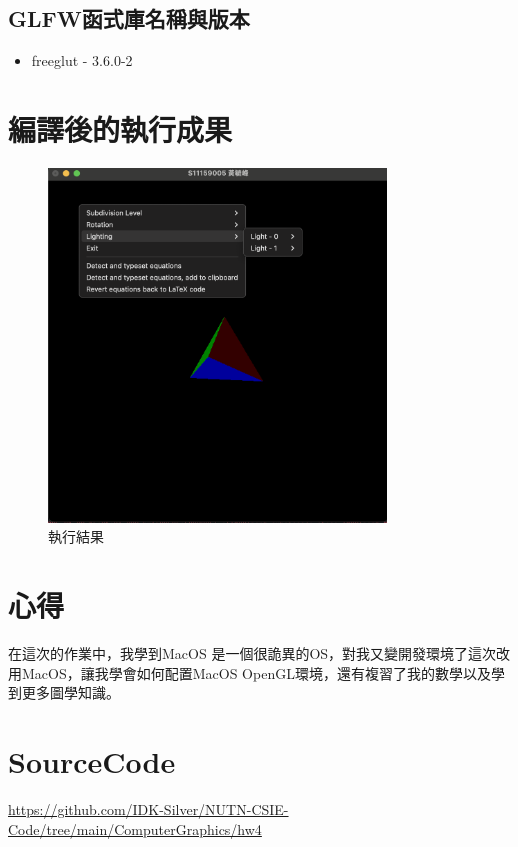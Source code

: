 \documentclass[12pt,a4paper]{article}
\begin{document}
\subsection*{GLFW函式庫名稱與版本}

\begin{itemize}
  \item freeglut - 3.6.0-2 
\end{itemize}
\newpage
\section*{編譯後的執行成果}
\begin{figure}[h]
  \centering
  \includegraphics[width=0.8\textwidth]{img/hw4_result.png}
  \caption{執行結果}
\end{figure}

\section*{心得}
在這次的作業中，我學到MacOS 是一個很詭異的OS，對我又變開發環境了這次改用MacOS，讓我學會如何配置MacOS OpenGL環境，還有複習了我的數學以及學到更多圖學知識。

\section*{SourceCode}
\sloppy
\noindent \url{https://github.com/IDK-Silver/NUTN-CSIE-Code/tree/main/ComputerGraphics/hw4}
\end{document}
